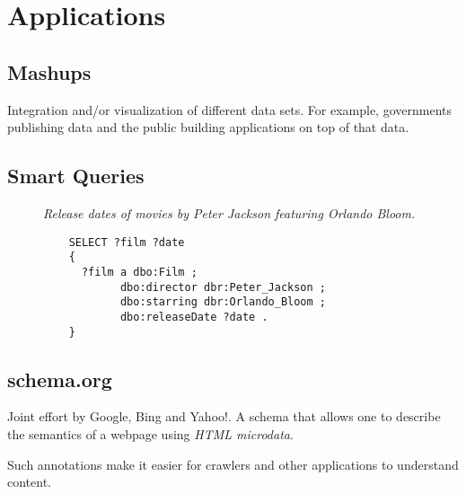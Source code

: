 \documentclass{report}
\begin{document}
\section{Applications}

\subsection{Mashups}

Integration and/or visualization of different data sets.
For example, governments publishing data
and the public building applications on top of that data.

\subsection{Smart Queries}

\begin{figure}[H]
  \textit{
    Release dates
    of movies
    by Peter Jackson
    featuring Orlando Bloom.
  }

  \begin{lstlisting}
    SELECT ?film ?date
    { 
      ?film a dbo:Film ;
            dbo:director dbr:Peter_Jackson ;
            dbo:starring dbr:Orlando_Bloom ;
            dbo:releaseDate ?date .
    }
  \end{lstlisting}
\end{figure}

\subsection{schema.org}

Joint effort by Google, Bing and Yahoo!.
A schema that allows one to describe
the semantics of a webpage using \emph{HTML microdata}.

Such annotations make it easier for crawlers
and other applications to understand content.
\end{document}

